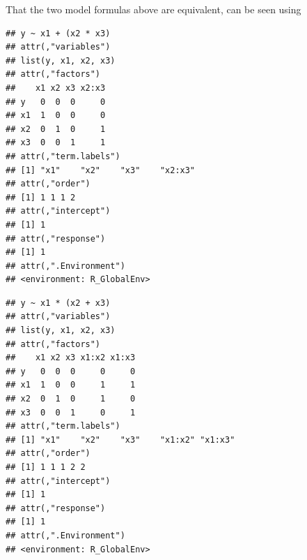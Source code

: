 \documentclass[krantz2]{krantz}\usepackage{knitr}%
\begin{document}
That the two model formulas above are equivalent, can be seen using 

\begin{knitrout}\footnotesize
{}\color{fgcolor}\begin{kframe}
\begin{alltt}
 \hlopt{~}  \hlopt{+}  \hlopt{*} 
\end{alltt}
\begin{verbatim}
## y ~ x1 + (x2 * x3)
## attr(,"variables")
## list(y, x1, x2, x3)
## attr(,"factors")
##    x1 x2 x3 x2:x3
## y   0  0  0     0
## x1  1  0  0     0
## x2  0  1  0     1
## x3  0  0  1     1
## attr(,"term.labels")
## [1] "x1"    "x2"    "x3"    "x2:x3"
## attr(,"order")
## [1] 1 1 1 2
## attr(,"intercept")
## [1] 1
## attr(,"response")
## [1] 1
## attr(,".Environment")
## <environment: R_GlobalEnv>
\end{verbatim}
\end{kframe}
\end{knitrout}

\begin{knitrout}\footnotesize
{}\color{fgcolor}\begin{kframe}
\begin{alltt}
 \hlopt{~}  \hlopt{*}  \hlopt{+} 
 \hlopt{~}  \hlopt{+}  \hlopt{+}  \hlopt{+} \hlopt{:} \hlopt{+} \hlopt{:}
\end{alltt}
\end{kframe}
\end{knitrout}

\begin{knitrout}\footnotesize
{}\color{fgcolor}\begin{kframe}
\begin{alltt}
 \hlopt{~}  \hlopt{*}  \hlopt{+} 
\end{alltt}
\begin{verbatim}
## y ~ x1 * (x2 + x3)
## attr(,"variables")
## list(y, x1, x2, x3)
## attr(,"factors")
##    x1 x2 x3 x1:x2 x1:x3
## y   0  0  0     0     0
## x1  1  0  0     1     1
## x2  0  1  0     1     0
## x3  0  0  1     0     1
## attr(,"term.labels")
## [1] "x1"    "x2"    "x3"    "x1:x2" "x1:x3"
## attr(,"order")
## [1] 1 1 1 2 2
## attr(,"intercept")
## [1] 1
## attr(,"response")
## [1] 1
## attr(,".Environment")
## <environment: R_GlobalEnv>
\end{verbatim}
\end{kframe}
\end{knitrout}
\end{document}
